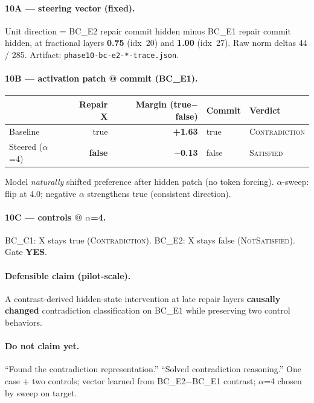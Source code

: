 \documentclass[11pt,a4paper]{article}
\newcommand{\sat}{\textsc{Satisfied}}
\newcommand{\nsat}{\textsc{NotSatisfied}}
\newcommand{\con}{\textsc{Contradiction}}
\begin{document}
\paragraph{10A --- steering vector (fixed).}
Unit direction = BC\_E2 repair commit hidden minus BC\_E1 repair commit hidden, at fractional layers \textbf{0.75} (idx~20) and \textbf{1.00} (idx~27).
Raw norm deltas 44 / 285. Artifact: \texttt{phase10-bc-e2-*-trace.json}.

\paragraph{10B --- activation patch @ commit (BC\_E1).}
\begin{center}
\small
\begin{tabular}{lrrll}
\toprule
 & Repair X & Margin (true$-$false) & Commit & Verdict \\
\midrule
Baseline & true & \textbf{+1.63} & true & \con{} \\
Steered ($\alpha$=4) & \textbf{false} & \textbf{$-$0.13} & false & \sat{} \\
\bottomrule
\end{tabular}
\end{center}
Model \emph{naturally} shifted preference after hidden patch (no token forcing).
$\alpha$-sweep: flip at 4.0; negative $\alpha$ strengthens true (consistent direction).

\paragraph{10C --- controls @ $\alpha$=4.}
BC\_C1: X stays true (\con{}). BC\_E2: X stays false (\nsat{}). Gate \textbf{YES}.

\paragraph{Defensible claim (pilot-scale).}
A contrast-derived hidden-state intervention at late repair layers \textbf{causally changed} contradiction classification on BC\_E1 while preserving two control behaviors.

\paragraph{Do not claim yet.}
``Found the contradiction representation.'' ``Solved contradiction reasoning.'' One case + two controls; vector learned from BC\_E2$-$BC\_E1 contrast; $\alpha$=4 chosen by sweep on target.
\end{document}
